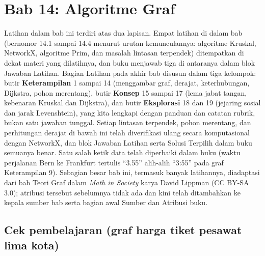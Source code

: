 
\section{Bab 14: Algoritme Graf}

Latihan dalam bab ini terdiri atas dua lapisan. Empat latihan di dalam bab (bernomor 14.1 sampai 14.4 menurut urutan kemunculannya: algoritme Kruskal, NetworkX, algoritme Prim, dan masalah lintasan terpendek) ditempatkan di dekat materi yang dilatihnya, dan buku menjawab tiga di antaranya dalam blok Jawaban Latihan. Bagian Latihan pada akhir bab disusun dalam tiga kelompok: butir \textbf{Keterampilan} 1 sampai 14 (menggambar graf, derajat, keterhubungan, Dijkstra, pohon merentang), butir \textbf{Konsep} 15 sampai 17 (lema jabat tangan, kebenaran Kruskal dan Dijkstra), dan butir \textbf{Eksplorasi} 18 dan 19 (jejaring sosial dan jarak Levenshtein), yang kita lengkapi dengan panduan dan catatan rubrik, bukan satu jawaban tunggal. Setiap lintasan terpendek, pohon merentang, dan perhitungan derajat di bawah ini telah diverifikasi ulang secara komputasional dengan NetworkX, dan blok Jawaban Latihan serta Solusi Terpilih dalam buku semuanya benar. Satu salah ketik data telah diperbaiki dalam buku (waktu perjalanan Bern ke Frankfurt tertulis ``3.55'' alih-alih ``3:55'' pada graf Keterampilan 9). Sebagian besar bab ini, termasuk banyak latihannya, diadaptasi dari bab Teori Graf dalam \emph{Math in Society} karya David Lippman (CC BY-SA 3.0); atribusi tersebut sebelumnya tidak ada dan kini telah ditambahkan ke kepala sumber bab serta bagian awal Sumber dan Atribusi buku.

\subsection*{Cek pembelajaran (graf harga tiket pesawat lima kota)}

